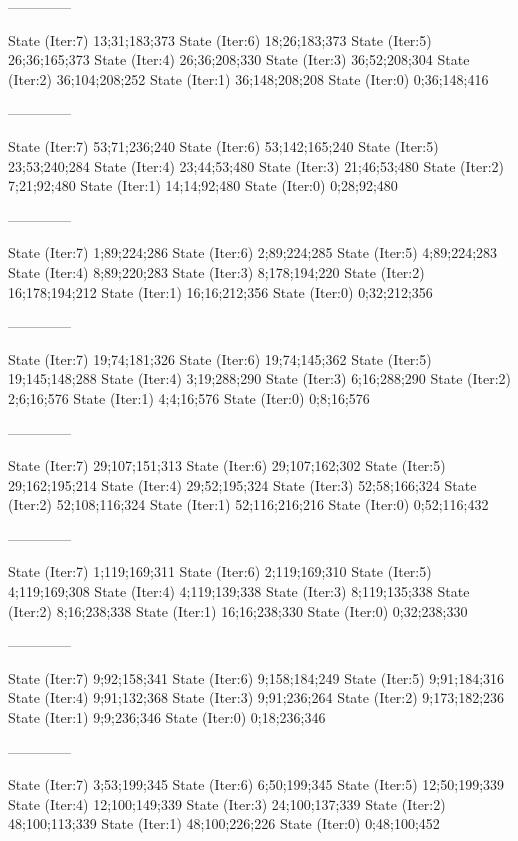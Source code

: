 \documentclass[a4paper,10pt,ngerman]{scrartcl}
\begin{document}
\begin{lstcs}
--------------

State (Iter:7) {13;31;183;373}
State (Iter:6) {18;26;183;373}
State (Iter:5) {26;36;165;373}
State (Iter:4) {26;36;208;330}
State (Iter:3) {36;52;208;304}
State (Iter:2) {36;104;208;252}
State (Iter:1) {36;148;208;208}
State (Iter:0) {0;36;148;416}

--------------

State (Iter:7) {53;71;236;240}
State (Iter:6) {53;142;165;240}
State (Iter:5) {23;53;240;284}
State (Iter:4) {23;44;53;480}
State (Iter:3) {21;46;53;480}
State (Iter:2) {7;21;92;480}
State (Iter:1) {14;14;92;480}
State (Iter:0) {0;28;92;480}

--------------

State (Iter:7) {1;89;224;286}
State (Iter:6) {2;89;224;285}
State (Iter:5) {4;89;224;283}
State (Iter:4) {8;89;220;283}
State (Iter:3) {8;178;194;220}
State (Iter:2) {16;178;194;212}
State (Iter:1) {16;16;212;356}
State (Iter:0) {0;32;212;356}

--------------

State (Iter:7) {19;74;181;326}
State (Iter:6) {19;74;145;362}
State (Iter:5) {19;145;148;288}
State (Iter:4) {3;19;288;290}
State (Iter:3) {6;16;288;290}
State (Iter:2) {2;6;16;576}
State (Iter:1) {4;4;16;576}
State (Iter:0) {0;8;16;576}

--------------

State (Iter:7) {29;107;151;313}
State (Iter:6) {29;107;162;302}
State (Iter:5) {29;162;195;214}
State (Iter:4) {29;52;195;324}
State (Iter:3) {52;58;166;324}
State (Iter:2) {52;108;116;324}
State (Iter:1) {52;116;216;216}
State (Iter:0) {0;52;116;432}

--------------

State (Iter:7) {1;119;169;311}
State (Iter:6) {2;119;169;310}
State (Iter:5) {4;119;169;308}
State (Iter:4) {4;119;139;338}
State (Iter:3) {8;119;135;338}
State (Iter:2) {8;16;238;338}
State (Iter:1) {16;16;238;330}
State (Iter:0) {0;32;238;330}

--------------

State (Iter:7) {9;92;158;341}
State (Iter:6) {9;158;184;249}
State (Iter:5) {9;91;184;316}
State (Iter:4) {9;91;132;368}
State (Iter:3) {9;91;236;264}
State (Iter:2) {9;173;182;236}
State (Iter:1) {9;9;236;346}
State (Iter:0) {0;18;236;346}

--------------

State (Iter:7) {3;53;199;345}
State (Iter:6) {6;50;199;345}
State (Iter:5) {12;50;199;339}
State (Iter:4) {12;100;149;339}
State (Iter:3) {24;100;137;339}
State (Iter:2) {48;100;113;339}
State (Iter:1) {48;100;226;226}
State (Iter:0) {0;48;100;452}


\end{lstcs}
\end{document}
